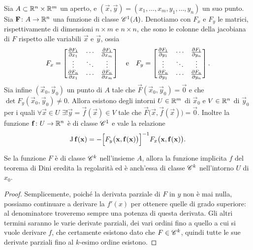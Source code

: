 \begin{teorema} \label{t:dini-Rn}
	Sia $A\subset\R^n\times\R^m$ un aperto, e $(\vec x,\vec y)=(x_1,\dots,x_m,y_1,\dots,y_n)$ un suo punto.
	Sia $\vec F\colon A\to\R^n$ una funzione di classe $\cont[1]{A}$.
	Denotiamo con $F_x$ e $F_y$ le matrici, rispettivamente di dimensioni $n\times m$ e $n\times n$, che sono le colonne della jacobiana di $F$ rispetto alle variabili $\vec x$ e $\vec y$, ossia
	\[
	F_x=
		\begin{bmatrix}
		\drp{F_1}{x_1}	&\cdots	&\drp{F_1}{x_m}\\
		\vdots			&\ddots	&\vdots\\
		\drp{F_n}{x_1}	&\cdots	&\drp{F_n}{x_m}
		\end{bmatrix}
	\qtext{e}
	F_y=
		\begin{bmatrix}
		\drp{F_1}{y_1}	&\cdots	&\drp{F_1}{y_n}\\
		\vdots			&\ddots	&\vdots\\
		\drp{F_n}{y_1}	&\cdots	&\drp{F_n}{y_n}
		\end{bmatrix}.
	\]
	Sia infine $(\vec x_0,\vec y_0)$ un punto di $A$ tale che $\vec F(\vec x_0,\vec y_0)=\vec 0$ e che $\det F_y(\vec x_0,\vec y_0)\neq 0$.
	Allora esistono degli intorni $U\in\R^m$ di $\vec x_0$ e $V\in\R^n$ di $\vec y_0$ per i quali $\forall\vec x\in U$ $\exists! \vec y=\vec f(\vec x)\in V$ tale che $\vec F\big(\vec x,\vec f(\vec x)\big)=\vec 0$.
	Inoltre la funzione $\vec f\colon U\to\R^n$ è di classe $\cclass[1]$ e vale la relazione
	\begin{equation} \label{eq:dini-Rn}
		\jac\vec f(\vec x)=-\Big[F_y\big(\vec x,\vec f(\vec x)\big)\Big]^{-1}F_x\big(\vec x,\vec f(\vec x)\big).
	\end{equation}
\end{teorema}
\begin{corollario}
	Se la funzione $F$ è di classe $\cclass[k]$ nell'insieme $A$, allora la funzione implicita $f$ del teorema di Dini eredita la regolarità ed è anch'essa di classe $\cclass[k]$ nell'intorno $U$ di $x_0$.
\end{corollario}
\begin{proof}
	Semplicemente, poiché la derivata parziale di $F$ in $y$ non è mai nulla, possiamo continuare a derivare la $f'(x)$ per ottenere quelle di grado superiore: al denominatore troveremo sempre una potenza di questa derivata.
	Gli altri termini saranno le varie derivate parziali, dei vari ordini fino a quello a cui si vuole derivare $f$, che certamente esistono dato che $F\in\cclass[k]$, quindi tutte le sue derivate parziali fino al $k$-esimo ordine esistono.
\end{proof}

